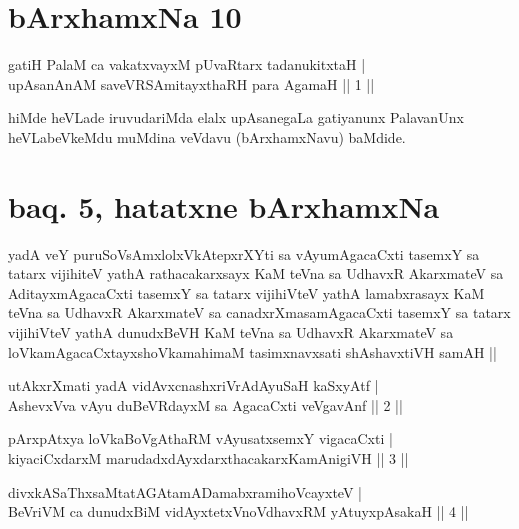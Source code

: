 
\section*{bArxhamxNa 10}


\begin{shl}
gatiH PalaM ca vakatxvayxM pUvaRtarx tadanukitxtaH | \\
upAsanAnAM saveVRSAmitayxthaRH para AgamaH \hfill ||  1 || 
\end{shl}

\begin{artha}
hiMde heVLade iruvudariMda elalx upAsanegaLa gatiyanunx PalavanUnx heVLabeVkeMdu muMdina veVdavu (bArxhamxNavu) baMdide.
\end{artha}

\section*{baq. 5, hatatxne bArxhamxNa \mdash }

\begin{shl}
yadA veY puruSoV\s sAmxlolxVkAtepxrXYti sa vAyumAgacaCxti tasemxY sa tatarx vijihiteV yathA rathacakarxsayx KaM teVna sa UdhavxR AkarxmateV sa AditayxmAgacaCxti tasemxY sa tatarx vijihiVteV yathA lamabxrasayx KaM teVna sa UdhavxR AkarxmateV sa canadxrXmasamAgacaCxti tasemxY sa tatarx vijihiVteV yathA dunudxBeVH KaM teVna sa UdhavxR AkarxmateV sa loVkamAgacaCxtayxshoVkamahimaM tasimxnavxsati shAshavxtiVH samAH || 
\end{shl}


\begin{shl}
utAkxrXmati yadA vidAvxcnashxriVrAdAyuSaH kaSxyAtf | \\
AshevxVva vAyu duBeVRdayxM sa AgacaCxti veVgavAnf \hfill ||  2 ||
\end{shl}

\begin{shl}
pArxpAtxya loVkaBoVgAthaRM vAyusatxsemxY vigacaCxti | \\
kiyaciCxdarxM marudadxdAyxdarxthacakarxKamAnigiVH \hfill ||  3 || 
\end{shl}

\begin{shl}
divxkASaThxsaMtatAGAtamADamabxramihoVcayxteV | \\
BeVriVM ca dunudxBiM vidAyxtetxVnoVdhavxRM yAtuyxpAsakaH \hfill ||  4 || 
\end{shl}

